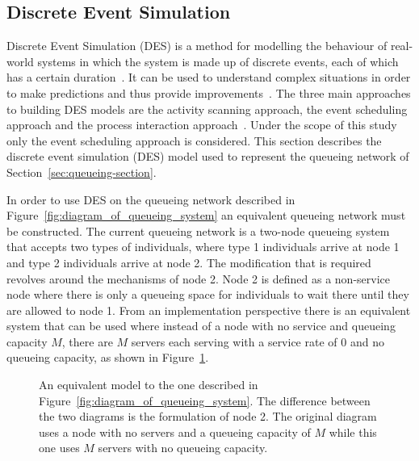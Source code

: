 \subsection{Discrete Event Simulation}\label{sec:discrete_event_simulation}

Discrete Event Simulation (DES) is a method for modelling the behaviour of
real-world systems in which the system is made up of discrete events, each of
which has a certain duration~\cite{DESstewart}.
It can be used to understand complex situations in order to make predictions
and thus provide improvements~\cite{VinceGeraintBook}.
The three main approaches to building DES models are the activity scanning
approach, the event scheduling approach and the process interaction
approach~\cite{DESapproaches}.
Under the scope of this study only the event scheduling approach is considered.
This section describes the discrete event simulation (DES) model used to
represent the queueing network of Section~\ref{sec:queueing-section}.

In order to use DES on the queueing network described in
Figure~\ref{fig:diagram_of_queueing_system} an equivalent queueing network must
be constructed.
The current queueing network is a two-node queueing system that accepts two
types of individuals, where type 1 individuals arrive at node 1 and
type 2 individuals arrive at node 2.
The modification that is required revolves around the mechanisms of node 2.
Node 2 is defined as a non-service node where there is only a queueing
space for individuals to wait there until they are allowed to node 1.
From an implementation perspective there is an equivalent system that can be
used where instead of a node with no service and queueing capacity \(M\), there
are \(M\) servers each serving with a service rate of \(0\) and no queueing
capacity, as shown in Figure~\ref{fig:equivalent_diagram_of_queueing_system}.

\begin{figure}[H]
    \centering
    
    \caption{An equivalent model to the one described in
    Figure~\ref{fig:diagram_of_queueing_system}. The difference between the two
    diagrams is the formulation of node 2. The original diagram uses
    a node with no servers and a queueing capacity of \(M\) while this one uses
    \(M\) servers with no queueing capacity.}
    \label{fig:equivalent_diagram_of_queueing_system}
\end{figure}
    


